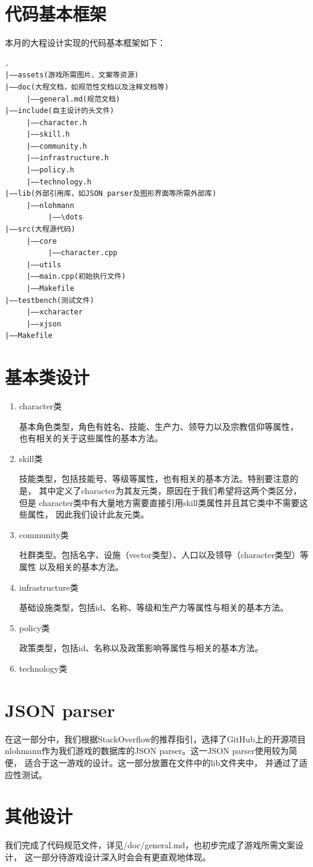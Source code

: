 \documentclass[UTF8]{ctexart}
\begin{document}
    \section{代码基本框架}
    本月的大程设计实现的代码基本框架如下：
\begin{lstlisting}
.
|——assets(游戏所需图片、文案等资源)
|——doc(大程文档，如规范性文档以及注释文档等)
     |——general.md(规范文档)
|——include(自主设计的头文件)
     |——character.h
     |——skill.h
     |——community.h
     |——infrastructure.h
     |——policy.h
     |——technology.h
|——lib(外部引用库，如JSON parser及图形界面等所需外部库)
     |——nlohmann
          |——\dots
|——src(大程源代码)
     |——core
          |——character.cpp
     |——utils
     |——main.cpp(初始执行文件)
     |——Makefile
|——testbench(测试文件)
     |——xcharacter
     |——xjson
|——Makefile
\end{lstlisting}
    
    \section{基本类设计}
    \begin{enumerate}
        \item character类
        
        基本角色类型，角色有姓名、技能、生产力、领导力以及宗教信仰等属性，
        也有相关的关于这些属性的基本方法。
        \item skill类
        
        技能类型，包括技能号、等级等属性，也有相关的基本方法。特别要注意的是，
        其中定义了character为其友元类，原因在于我们希望将这两个类区分，但是
        character类中有大量地方需要直接引用skill类属性并且其它类中不需要这些属性，
        因此我们设计此友元类。
        \item community类
        
        社群类型。包括名字、设施（vector类型）、人口以及领导（character类型）等属性
        以及相关的基本方法。
        \item infrastructure类
        
        基础设施类型，包括id、名称、等级和生产力等属性与相关的基本方法。
        \item policy类
        
        政策类型，包括id、名称以及政策影响等属性与相关的基本方法。
        \item technology类

    \end{enumerate}

    \section{JSON parser}
    在这一部分中，我们根据StackOverflow的推荐指引，选择了GitHub上的开源项目
    nlohmann作为我们游戏的数据库的JSON parser。这一JSON parser使用较为简便，
    适合于这一游戏的设计。这一部分放置在文件中的lib文件夹中，
    并通过了适应性测试。

    \section{其他设计}
    我们完成了代码规范文件，详见/doc/general.md，也初步完成了游戏所需文案设计，
    这一部分待游戏设计深入时会会有更直观地体现。
\end{document}
